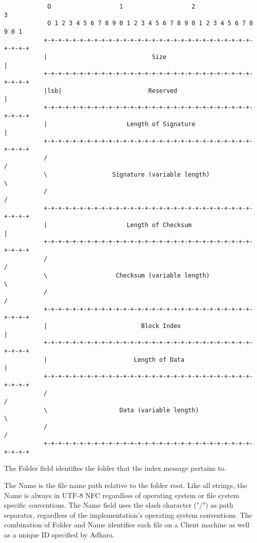 \begin{verbatim}
            O                   1                   2                   3
            O 1 2 3 4 5 6 7 8 9 0 1 2 3 4 5 6 7 8 9 0 1 2 3 4 5 6 7 8 9 0 1
           +-+-+-+-+-+-+-+-+-+-+-+-+-+-+-+-+-+-+-+-+-+-+-+-+-+-+-+-+-+-+-+-+
           |                             Size                              |
           +-+-+-+-+-+-+-+-+-+-+-+-+-+-+-+-+-+-+-+-+-+-+-+-+-+-+-+-+-+-+-+-+
           |lsb|                        Reserved                           |
           +-+-+-+-+-+-+-+-+-+-+-+-+-+-+-+-+-+-+-+-+-+-+-+-+-+-+-+-+-+-+-+-+
           |                      Length of Signature                      |
           +-+-+-+-+-+-+-+-+-+-+-+-+-+-+-+-+-+-+-+-+-+-+-+-+-+-+-+-+-+-+-+-+
           /                                                               /
           \                  Signature (variable length)                  \
           /                                                               /
           +-+-+-+-+-+-+-+-+-+-+-+-+-+-+-+-+-+-+-+-+-+-+-+-+-+-+-+-+-+-+-+-+
           |                      Length of Checksum                       |
           +-+-+-+-+-+-+-+-+-+-+-+-+-+-+-+-+-+-+-+-+-+-+-+-+-+-+-+-+-+-+-+-+
           /                                                               /
           \                   Checksum (variable length)                  \
           /                                                               /
           +-+-+-+-+-+-+-+-+-+-+-+-+-+-+-+-+-+-+-+-+-+-+-+-+-+-+-+-+-+-+-+-+
           |                          Block Index                          |
           +-+-+-+-+-+-+-+-+-+-+-+-+-+-+-+-+-+-+-+-+-+-+-+-+-+-+-+-+-+-+-+-+
           |                        Length of Data                         |
           +-+-+-+-+-+-+-+-+-+-+-+-+-+-+-+-+-+-+-+-+-+-+-+-+-+-+-+-+-+-+-+-+
           /                                                               /
           \                    Data (variable length)                     \
           /                                                               /
           +-+-+-+-+-+-+-+-+-+-+-+-+-+-+-+-+-+-+-+-+-+-+-+-+-+-+-+-+-+-+-+-+
\end{verbatim}

The Folder field identifies the folder that the index message pertains
to.

The Name is the file name path relative to the folder root. Like all
strings, the Name is always in UTF-8 NFC regardless of operating system
or file system specific conventions. The Name field uses the slash
character ("/") as path separator, regardless of the implementation's
operating system conventions. The combination of Folder and Name
identifies each file on a Client machine as well as a unique ID
specified by Adhara.

